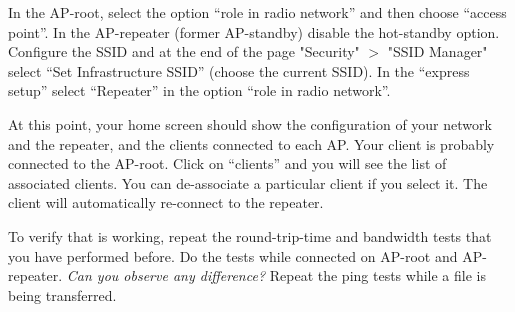 In the AP-root, select the option ``role in radio network'' and then choose ``access point''.
In the AP-repeater (former AP-standby) disable the hot-standby option.
Configure the SSID and at the end of the page "Security" $>$ "SSID Manager" select ``Set Infrastructure SSID'' (choose the current SSID).
In the ``express setup'' select ``Repeater'' in the option ``role in radio network''.

At this point, your home screen should show the configuration of your network and the repeater, and the clients connected to each AP.
Your client is probably connected to the AP-root.
Click on ``clients'' and you will see the list of associated clients.
You can de-associate a particular client if you select it.
The client will automatically re-connect to the repeater.

To verify that is working, repeat the round-trip-time and bandwidth tests that you have performed before.
Do the tests while connected on AP-root and AP-repeater.
\emph{Can you observe any difference?}
Repeat the ping tests while a file is being transferred.


